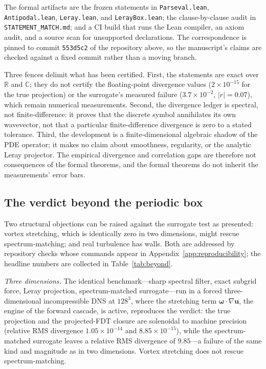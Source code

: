 \documentclass[11pt]{article}
\begin{document}
The formal artifacts are the frozen statements in \texttt{Parseval.lean}, \texttt{Antipodal.lean}, \texttt{Leray.lean}, and \texttt{LerayBox.lean}; the clause-by-clause audit in \texttt{STATEMENT\_MATCH.md}; and a CI build that runs the Lean compiler, an axiom audit, and a source scan for unsupported declarations. The correspondence is pinned to commit \texttt{553d5c2} of the repository above, so the manuscript's claims are checked against a fixed commit rather than a moving branch.

Three fences delimit what has been certified. First, the statements are exact over $\mathbb{R}$ and $\mathbb{C}$; they do not certify the floating-point divergence values ($2\times10^{-15}$ for the true projection) or the surrogate's measured failure ($3.7\times10^{-2}$, $|r|=0.07$), which remain numerical measurements. Second, the divergence ledger is spectral, not finite-difference: it proves that the discrete symbol annihilates its own wavevector, not that a particular finite-difference divergence is zero to a stated tolerance. Third, the development is a finite-dimensional algebraic shadow of the PDE operator; it makes no claim about smoothness, regularity, or the analytic Leray projector. The empirical divergence and correlation gaps are therefore not consequences of the formal theorems, and the formal theorems do not inherit the measurements' error bars.

\subsection{The verdict beyond the periodic box}
\label{sec:beyond}

Two structural objections can be raised against the surrogate test as presented: vortex stretching, which is identically zero in two dimensions, might rescue spectrum-matching; and real turbulence has walls. Both are addressed by repository checks whose commands appear in Appendix~\ref{app:reproducibility}; the headline numbers are collected in Table~\ref{tab:beyond}.

\emph{Three dimensions.} The identical benchmark---sharp spectral filter, exact subgrid force, Leray projection, spectrum-matched surrogate---run in a forced three-dimensional incompressible DNS at $128^3$, where the stretching term $\boldsymbol{\omega}\cdot\nabla\mathbf{u}$, the engine of the forward cascade, is active, reproduces the verdict: the true projection and the projected-FDT closure are solenoidal to machine precision (relative RMS divergence $1.05\times10^{-14}$ and $8.85\times10^{-15}$), while the spectrum-matched surrogate leaves a relative RMS divergence of $9.85$---a failure of the same kind and magnitude as in two dimensions. Vortex stretching does not rescue spectrum-matching.
\end{document}
